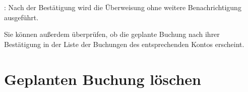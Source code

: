 \begin{enumerate}
\end{enumerate}

\Note{}: Nach der Bestätigung wird die Überweisung ohne weitere Benachrichtigung ausgeführt.

Sie können außerdem überprüfen, ob die geplante Buchung nach ihrer Bestätigung in der Liste der Buchungen des entsprechenden Kontos erscheint.


\section{Geplanten Buchung löschen\label{plannedtransactions-remove}}

